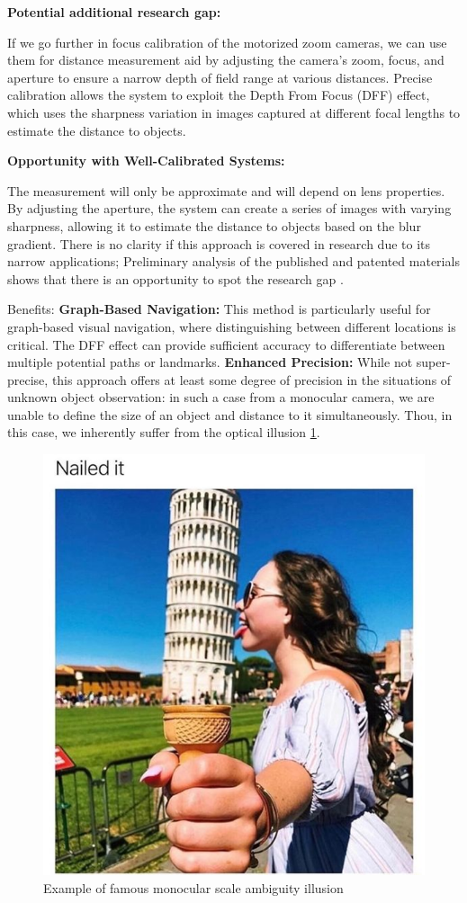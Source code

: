 \documentclass[runningheads]{llncs}
\begin{document}
\textbf{Potential additional research gap:}

If we go further in focus calibration of the motorized zoom cameras, we can use them for distance measurement aid by adjusting the camera's zoom, focus, and aperture to ensure a narrow depth of field range at various distances. Precise calibration allows the system to exploit the Depth From Focus (DFF) effect, which uses the sharpness variation in images captured at different focal lengths to estimate the distance to objects.

\textbf{Opportunity with Well-Calibrated Systems:}

The measurement will only be approximate and will depend on lens properties. By adjusting the aperture, the system can create a series of images with varying sharpness, allowing it to estimate the distance to objects based on the blur gradient. There is no clarity if this approach is covered in research due to its narrow applications; Preliminary analysis of the published and patented materials shows that there is an opportunity to spot the research gap \cite{morrison_coded_apperture_2009vision}.

Benefits:
    \textbf{Graph-Based Navigation:} This method is particularly useful for graph-based visual navigation, where distinguishing between different locations is critical. The DFF effect can provide sufficient accuracy to differentiate between multiple potential paths or landmarks.
    \textbf{Enhanced Precision:} While not super-precise, this approach offers at least some degree of precision in the situations of unknown object observation: in such a case from a monocular camera, we are unable to define the size of an object and distance to it simultaneously. Thou, in this case, we inherently suffer from the optical illusion \ref{fig:scale-illusion}.
    \begin{figure}
        \centering
        \includegraphics[width=0.5\linewidth]{img/Optical_illusion.png}
        \caption{Example of famous monocular scale ambiguity illusion}
        \label{fig:scale-illusion}
    \end{figure}
\end{document}
